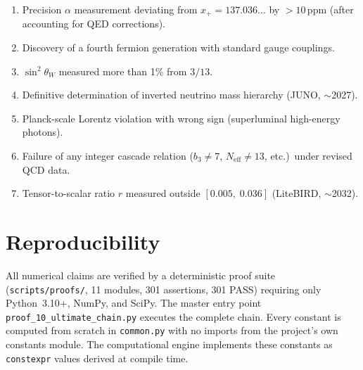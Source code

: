 \documentclass[12pt]{article}
\theoremstyle{definition}
\theoremstyle{remark}
\begin{document}
\begin{enumerate}[nosep,label=\textbf{F\arabic*.}]
\item Precision $\alpha$ measurement deviating from $x_+ = 137.036\ldots$ by $> 10$\,ppm
      (after accounting for QED corrections).
\item Discovery of a fourth fermion generation with standard gauge couplings.
\item $\sin^2\!\theta_W$ measured more than 1\% from $3/13$.
\item Definitive determination of inverted neutrino mass hierarchy
      (JUNO, $\sim$2027).
\item Planck-scale Lorentz violation with wrong sign (superluminal high-energy photons).
\item Failure of any integer cascade relation
      ($b_3 \neq 7$, $N_\text{eff} \neq 13$, etc.)\ under revised QCD data.
\item Tensor-to-scalar ratio $r$ measured outside $[0.005,\; 0.036]$
      (LiteBIRD, $\sim$2032).
\end{enumerate}

\section{Reproducibility}

\noindent All numerical claims are verified by a deterministic proof suite
(\texttt{scripts/proofs/}, 11 modules, 301 assertions, 301 PASS) requiring
only Python~3.10+, NumPy, and SciPy. The master entry point
\texttt{proof\_10\_ultimate\_chain.py} executes the complete chain.
Every constant is computed from scratch in \texttt{common.py}
with no imports from the project's own constants module. The computational engine implements these constants as \texttt{constexpr} values derived at compile time.

\end{document}
